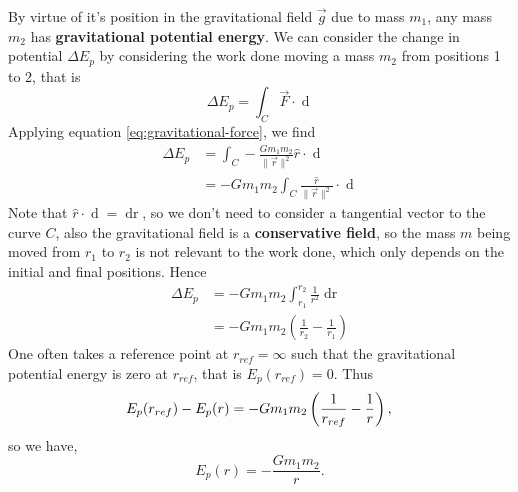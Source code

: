 By virtue of it's position in the gravitational field $\vec{g}$ due to mass $m_1$, any mass $m_2$ has \textbf{gravitational potential energy}. We can consider the change in potential $\Delta E_p$ by considering the work done moving a mass $m_2$ from positions 1 to 2, that is
\begin{equation}
    \Delta E_p = \int_C \vec{F} \cdot \mathop{\mathrm{d}\vec{r}}
\end{equation}
Applying equation \ref{eq:gravitational-force}, we find 
\begin{align}
    \Delta E_p &= \int_C - \frac{G m_1 m_2}{\| \vec{r} \|^2} \hat{r} \cdot \mathop{\mathrm{d}\vec{r}} \\
    &= - G m_1 m_2 \int_C \frac{\hat{r}}{\| \vec{r} \|^2} \cdot \mathop{\mathrm{d}\vec{r}}
\end{align}
Note that $\hat{r} \cdot \mathop{\mathrm{d}\vec{r}} = \mathop{\mathrm{d}r}$, so we don't need to consider a tangential vector to the curve $C$, also the gravitational field is a \textbf{conservative field}, so the mass $m$ being moved from $r_1$ to $r_2$ is not relevant to the work done, which only depends on the initial and final positions. Hence
\begin{align}
    \Delta E_p &= -G m_1 m_2 \int_{r_1}^{r_2} \frac{1}{r^2} \mathop{\mathrm{d}r} \\ 
    &= -Gm_1m_2 \left(\frac{1}{r_2} - \frac{1}{r_1}\right)
\end{align}
One often takes a reference point at $r_{ref} = \infty$ such that the gravitational potential energy is zero at $r_{ref}$, that is $E_p(r_{ref}) = 0$. Thus
\begin{equation}
    E_p(r_{ref}) - E_p(r) = -Gm_1m_2 \left(\frac{1}{r_{ref}} - \frac{1}{r}\right), \\
\end{equation} 
so we have,
\begin{equation}
    E_p(r) = - \frac{G m_1 m_2}{r}.
\end{equation}


